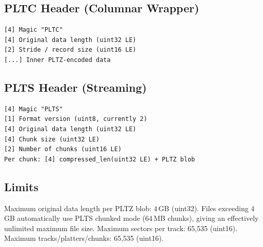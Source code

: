 \documentclass[11pt,a4paper]{article}
\begin{document}
\subsection{PLTC Header (Columnar Wrapper)}

\begin{lstlisting}
[4] Magic "PLTC"
[4] Original data length (uint32 LE)
[2] Stride / record size (uint16 LE)
[...] Inner PLTZ-encoded data
\end{lstlisting}

\subsection{PLTS Header (Streaming)}

\begin{lstlisting}
[4] Magic "PLTS"
[1] Format version (uint8, currently 2)
[4] Original data length (uint32 LE)
[4] Chunk size (uint32 LE)
[2] Number of chunks (uint16 LE)
Per chunk: [4] compressed_len(uint32 LE) + PLTZ blob
\end{lstlisting}

\subsection{Limits}

Maximum original data length per PLTZ blob: 4\,GB (uint32). Files exceeding 4\,GB automatically use PLTS chunked mode (64\,MB chunks), giving an effectively unlimited maximum file size. Maximum sectors per track: 65,535 (uint16). Maximum tracks/platters/chunks: 65,535 (uint16).
\end{document}
